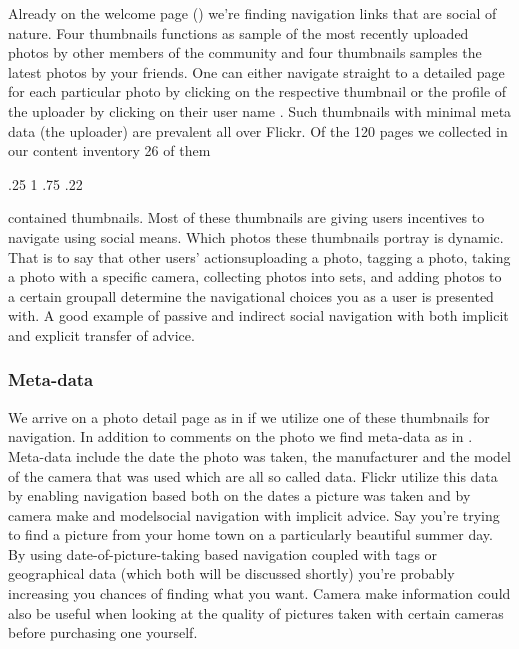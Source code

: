Already on the welcome page ()
we're finding navigation links that are social of
nature. Four thumbnails functions as sample of the most recently uploaded
photos by other members of the community and four thumbnails samples the
latest photos by your friends.
One can either navigate straight to
a detailed page for each particular photo by clicking on the respective
thumbnail 
or the profile of the uploader by clicking on their user
name . Such thumbnails
with minimal meta data (the uploader) are prevalent all over Flickr. Of the
120 pages we collected in our content inventory 26 of them
\begin{sparkline}{3}
  \sparkspike .25  1
  \sparkspike .75  .22
\end{sparkline}
contained thumbnails. Most of these thumbnails
are giving users incentives to navigate using social means.%
Which photos these thumbnails portray is dynamic. That is to say that other
users' actions\dash{}uploading a photo, tagging a photo, taking a photo with a
specific camera, collecting photos into sets, and adding photos to a certain
\placeflickrmetadata%
group\dash{}all determine the navigational choices you as a user is
presented with. A good example of passive and indirect social navigation
with both implicit and explicit transfer of advice.

\subsubsection{Meta-data}

We arrive on a photo detail page  as in
if we utilize one of these thumbnails for navigation. In addition to comments
on the photo we find meta-data as in 
.
Meta-data include the date the photo was taken, the manufacturer and the model
of the camera that was used which are all so called %
data. Flickr utilize this data by enabling navigation based both on the
dates a picture was taken and by camera make and model\dash{}social navigation
with implicit advice. Say you're trying to
find a picture from your home town on a particularly beautiful summer day. By
using date-of-picture-taking based navigation coupled with tags or
geographical data (which both will be discussed shortly) you're probably
increasing you chances of finding what you want. Camera make information could
also be useful when looking at the quality of pictures taken with certain
cameras before purchasing one yourself.

